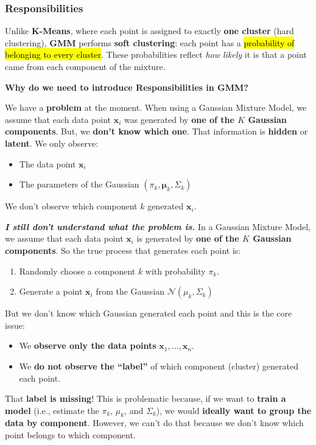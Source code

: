 \subsubsection{Responsibilities}

Unlike \textbf{K-Means}, where each point is assigned to exactly \textbf{one cluster} (hard clustering), \textbf{GMM} performs \textbf{soft clustering}: each point has a \hl{probability of belonging to every cluster}. These probabilities reflect \emph{how likely} it is that a point came from each component of the mixture.

\highspace
\begin{flushleft}
    \textcolor{Green3}{ \textbf{Why do we need to introduce Responsibilities in GMM?}}
\end{flushleft}
\textcolor{Red2}{} We have a \textcolor{Red2}{\textbf{problem}} at the moment. When using a Gaussian Mixture Model, we assume that each data point $\mathbf{x}_{i}$ was generated by \textbf{one of the $K$ Gaussian components}. But, we \textbf{don't know which one}. That information is \textbf{hidden} or \textbf{latent}. We only observe:
\begin{itemize}
    \item The data point $\mathbf{x}_{i}$
    \item The parameters of the Gaussian $\left(\pi_{k}, \boldsymbol{\mu}_{k}, \Sigma_{k}\right)$
\end{itemize}
We don't observe which component $k$ generated $\mathbf{x}_{i}$.

\highspace
\textcolor{Red2}{\textbf{\emph{I still don't understand what the problem is.}}} In a Gaussian Mixture Model, we assume that each data point $\mathbf{x}_{i}$ is generated by \textbf{one of the $K$ Gaussian components}. So the true process that generates each point is:
\begin{enumerate}
    \item Randomly choose a component $k$ with probability $\pi_{k}$.
    \item Generate a point $\mathbf{x}_{i}$ from the Gaussian $\mathcal{N}\left(\mu_{k}, \Sigma_{k}\right)$
\end{enumerate}
But we don't know which Gaussian generated each point and this is the core issue:
\begin{itemize}
    \item We \textbf{observe only the data points} $\mathbf{x}_{1}, \dots, \mathbf{x}_{n}$.
    \item We \textbf{do not observe the ``label''} of which component (cluster) generated each point.
\end{itemize}
That \textbf{label is missing}! This is problematic because, if we want to \textbf{train a model} (i.e., estimate the $\pi_{k}$, $\mu_{k}$, and $\Sigma_{k}$), we would \textbf{ideally want to group the data by component}. However, we can't do that because we don't know which point belongs to which component.

